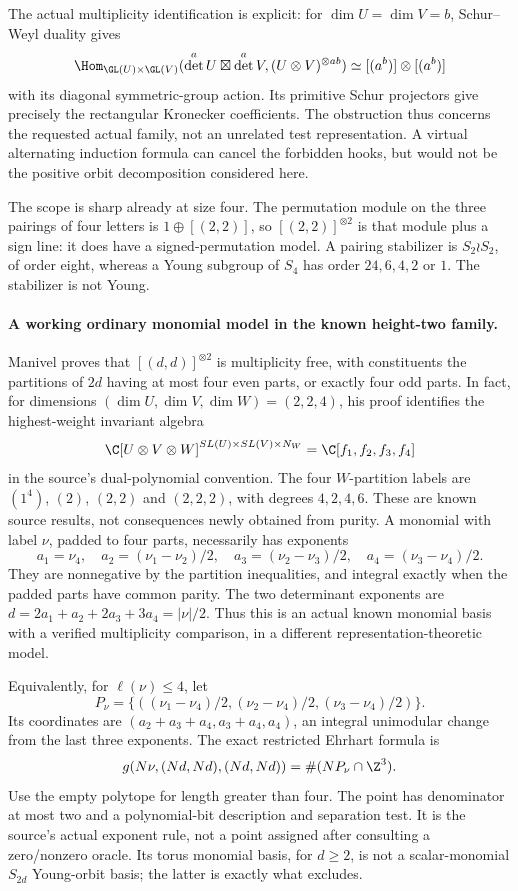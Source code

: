 The actual multiplicity identification is explicit: for $\dim U=\dim V=b$,
Schur--Weyl duality gives
\[
 \Hom_{\GL(U)\times\GL(V)}
 (\det^aU\boxtimes\det^aV,(U\otimes V)^{\otimes ab})
 \simeq[(a^b)]\otimes[(a^b)]
\]
with its diagonal symmetric-group action. Its primitive Schur
projectors give precisely the rectangular Kronecker coefficients.
The obstruction thus concerns the requested actual family, not an
unrelated test representation. A virtual alternating induction formula
can cancel the forbidden hooks, but would not be the positive orbit
decomposition considered here.

The scope is sharp already at size four. The permutation module on
the three pairings of four letters is $1\oplus[(2,2)]$, so
$[(2,2)]^{\otimes2}$ is that module plus a sign line: it does have
a signed-permutation model. A pairing stabilizer is
$S_2\wr S_2$, of order eight, whereas a Young subgroup of $S_4$ has
order $24,6,4,2$ or $1$. The stabilizer is not Young.

\paragraph{A working ordinary monomial model in the known height-two family.}
Manivel \cite[Theorem~1, p.~1; \S\S2--3, pp.~2--4]{Manivel} proves
that $[(d,d)]^{\otimes2}$ is multiplicity free, with constituents the
partitions of $2d$ having at most four even parts, or exactly four odd
parts. In fact, for dimensions $(\dim U,\dim V,\dim W)=(2,2,4)$,
his proof identifies the highest-weight invariant algebra
\[
 \C[U\otimes V\otimes W]^{SL(U)\times SL(V)\times N_W}
 =\C[f_1,f_2,f_3,f_4]
\]
in the source's dual-polynomial convention. The four $W$-partition
labels are $(1^4)$, $(2)$, $(2,2)$ and $(2,2,2)$, with degrees $4,2,4,6$.
These are known source results, not consequences newly obtained from
purity. A monomial with label $\nu$, padded to four parts, necessarily
has exponents
\[
 a_1=\nu_4,\quad a_2=(\nu_1-\nu_2)/2,\quad
 a_3=(\nu_2-\nu_3)/2,\quad a_4=(\nu_3-\nu_4)/2.
\]
They are nonnegative by the partition inequalities, and integral
exactly when the padded parts have common parity. The two determinant
exponents are $d=2a_1+a_2+2a_3+3a_4=|\nu|/2$.
Thus this is an actual known monomial basis with a verified
multiplicity comparison, in a different representation-theoretic model.

Equivalently, for $\ell(\nu)\le4$, let
\[
 P_\nu=\{((\nu_1-\nu_4)/2,(\nu_2-\nu_4)/2,(\nu_3-\nu_4)/2)\}.
\]
Its coordinates are $(a_2+a_3+a_4,a_3+a_4,a_4)$, an integral
unimodular change from the last three exponents. The exact restricted
Ehrhart formula is
\[
 g(N\nu,(Nd,Nd),(Nd,Nd))=\#(NP_\nu\cap\Z^3).
\]
Use the empty polytope for length greater than four. The point has
denominator at most two and a polynomial-bit description and
separation test. It is the source's actual exponent rule, not a
point assigned after consulting a zero/nonzero oracle. Its torus
monomial basis, for $d\ge2$, is not a scalar-monomial $S_{2d}$ Young-orbit basis;
the latter is exactly what  excludes.


